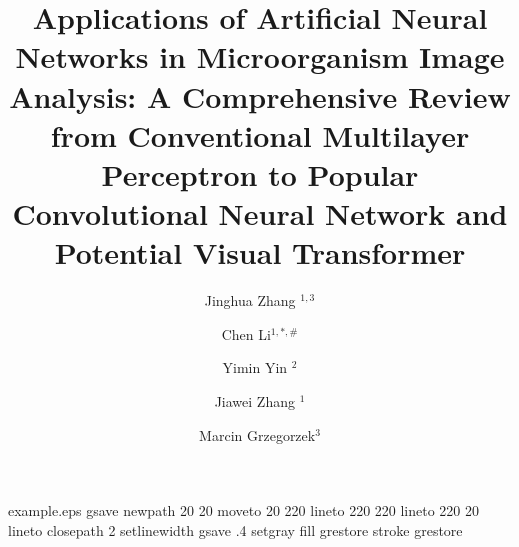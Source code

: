 \begin{filecontents*}{example.eps}
gsave
newpath
  20 20 moveto
  20 220 lineto
  220 220 lineto
  220 20 lineto
closepath
2 setlinewidth
gsave
  .4 setgray fill
grestore
stroke
grestore
\end{filecontents*}
%
\RequirePackage{fix-cm}
%
\documentclass[smallextended]{svjour3}       %
%
\smartqed  %
%
\usepackage{graphicx}
\usepackage{color}
\usepackage{subfigure}
\usepackage{longtable}
\usepackage{lscape}
\usepackage{multirow}
\usepackage{color}

%
%
%
%
%


\title{Applications of Artificial Neural Networks in Microorganism Image Analysis: 
A Comprehensive Review from Conventional Multilayer Perceptron to 
Popular Convolutional Neural Network and Potential Visual Transformer}

\author{Jinghua Zhang $^{1, 3}$         \and
        Chen Li$^{1, *, \#}$ \and
        Yimin Yin $^{2}$\and 
        Jiawei Zhang $^{1}$\and
        Marcin Grzegorzek$^3$ %
}



